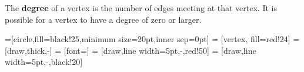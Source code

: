 \documentclass{beamer}
\theoremstyle{definition}
\begin{document}
\begin{frame}


\begin{definition}
The \textbf{degree} of a vertex is the number of edges meeting at that vertex.  It is possible for a vertex to have a degree of zero or larger.
\end{definition}

=[circle,fill=black!25,minimum size=20pt,inner sep=0pt]
 = [vertex, fill=red!24]
 = [draw,thick,-]
 = [font=\small]
 = [draw,line width=5pt,-,red!50]
 = [draw,line width=5pt,-,black!20]


\begin{figure}
\end{figure}

\end{frame}
\end{document}
